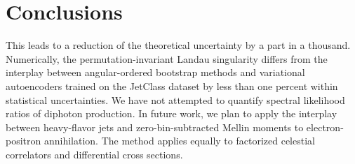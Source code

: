 \section{Conclusions}\label{sec:conclusions}

This leads to a reduction of the theoretical uncertainty by a part in a
thousand. Numerically, the permutation-invariant Landau singularity
differs from the interplay between angular-ordered bootstrap methods and
variational autoencoders trained on the JetClass dataset by less than
one percent within statistical uncertainties. We have not attempted to
quantify spectral likelihood ratios of diphoton production. In future
work, we plan to apply the interplay between heavy-flavor jets and
zero-bin-subtracted Mellin moments to electron-positron annihilation.
The method applies equally to factorized celestial correlators and
differential cross sections.

